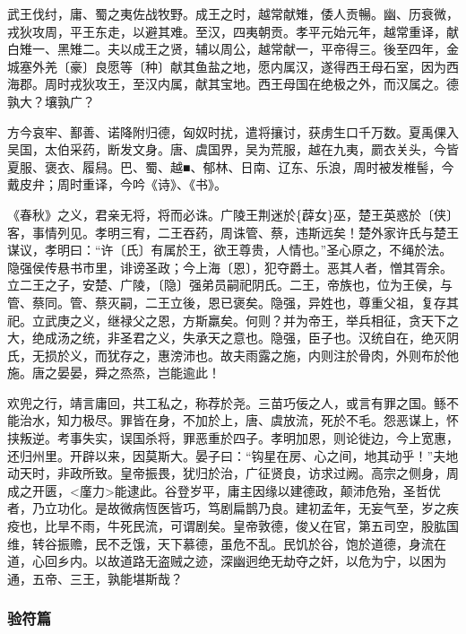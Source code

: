 \documentclass[]{article}
\begin{document}
武王伐纣，庸、蜀之夷佐战牧野。成王之时，越常献雉，倭人贡暢。幽、历衰微，戎狄攻周，平王东走，以避其难。至汉，四夷朝贡。孝平元始元年，越常重译，献白雉一、黑雉二。夫以成王之贤，辅以周公，越常献一，平帝得三。後至四年，金城塞外羌〔豪〕良愿等〔种〕献其鱼盐之地，愿内属汉，遂得西王母石室，因为西海郡。周时戎狄攻王，至汉内属，献其宝地。西王母国在绝极之外，而汉属之。德孰大？壤孰广？

方今哀牢、鄯善、诺降附归德，匈奴时扰，遣将攘讨，获虏生口千万数。夏禹倮入吴国，太伯采药，断发文身。唐、虞国界，吴为荒服，越在九夷，罽衣关头，今皆夏服、褒衣、履舄。巴、蜀、越■、郁林、日南、辽东、乐浪，周时被发椎髻，今戴皮弁；周时重译，今吟《诗》、《书》。

《春秋》之义，君亲无将，将而必诛。广陵王荆迷於\{薜女\}巫，楚王英惑於〔侠〕客，事情列见。孝明三宥，二王吞药，周诛管、蔡，违斯远矣！楚外家许氏与楚王谋议，孝明曰：``许〔氏〕有属於王，欲王尊贵，人情也。''圣心原之，不绳於法。隐强侯传悬书市里，诽谤圣政；今上海〔恩〕，犯夺爵土。恶其人者，憎其胥余。立二王之子，安楚、广陵，〔隐〕强弟员嗣祀阴氏。二王，帝族也，位为王侯，与管、蔡同。管、蔡灭嗣，二王立後，恩已褒矣。隐强，异姓也，尊重父祖，复存其祀。立武庚之义，继禄父之恩，方斯羸矣。何则？并为帝王，举兵相征，贪天下之大，绝成汤之统，非圣君之义，失承天之意也。隐强，臣子也。汉统自在，绝灭阴氏，无损於义，而犹存之，惠滂沛也。故夫雨露之施，内则注於骨肉，外则布於他施。唐之晏晏，舜之烝烝，岂能逾此！

欢兜之行，靖言庸回，共工私之，称荐於尧。三苗巧佞之人，或言有罪之国。鲧不能治水，知力极尽。罪皆在身，不加於上，唐、虞放流，死於不毛。怨恶谋上，怀挟叛逆。考事失实，误国杀将，罪恶重於四子。孝明加恩，则论徙边，今上宽惠，还归州里。开辟以来，因莫斯大。晏子曰：``钩星在房、心之间，地其动乎！''夫地动天时，非政所致。皇帝振畏，犹归於治，广征贤良，访求过阙。高宗之侧身，周成之开匮，\textless{}廑力\textgreater{}能逮此。谷登岁平，庸主因缘以建德政，颠沛危殆，圣哲优者，乃立功化。是故微病恆医皆巧，笃剧扁鹊乃良。建初孟年，无妄气至，岁之疾疫也，比旱不雨，牛死民流，可谓剧矣。皇帝敦德，俊乂在官，第五司空，股肱国维，转谷振赡，民不乏饿，天下慕德，虽危不乱。民饥於谷，饱於道德，身流在道，心回乡内。以故道路无盗贼之迹，深幽迥绝无劫夺之奸，以危为宁，以困为通，五帝、三王，孰能堪斯哉？

\hypertarget{header-n784}{%
\subsubsection{验符篇}\label{header-n784}}
\end{document}
